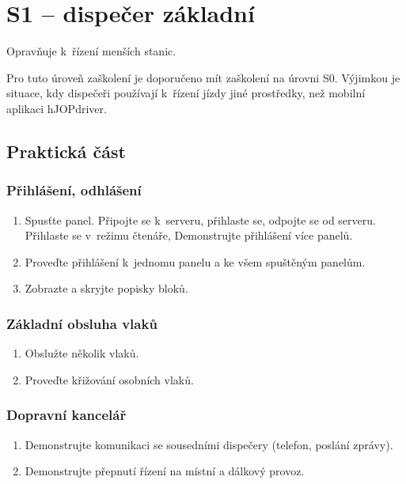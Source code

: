 \documentclass[12pt,a4paper]{article}
\begin{document}
\newpage

\section{S1 – dispečer základní}

Opravňuje k~řízení menších stanic.

Pro tuto úroveň zaškolení je doporučeno mít zaškolení na úrovni S0. Výjimkou
je situace, kdy dispečeři používají k~řízení jízdy jiné prostředky, než mobilní
aplikaci hJOPdriver.

\subsection{Praktická část}

\subsubsection*{Přihlášení, odhlášení}
\begin{enumerate}[leftmargin=*]
\item Spusťte panel. Připojte se k~serveru, přihlaste se, odpojte se od
serveru. Přihlaste se v~režimu čtenáře, Demonstrujte přihlášení více panelů.
\item Proveďte přihlášení k~jednomu panelu a ke všem spuštěným panelům.
\item Zobrazte a skryjte popisky bloků.
\end{enumerate}

\subsubsection*{Základní obsluha vlaků}
\begin{enumerate}[leftmargin=*]
\item Obslužte několik vlaků.
\item Proveďte křižování osobních vlaků.
\end{enumerate}

\subsubsection*{Dopravní kancelář}
\begin{enumerate}[leftmargin=*]
\item Demonstrujte komunikaci se sousedními dispečery (telefon, poslání zprávy).
\item Demonstrujte přepnutí řízení na místní a dálkový provoz.
\end{enumerate}
\end{document}
